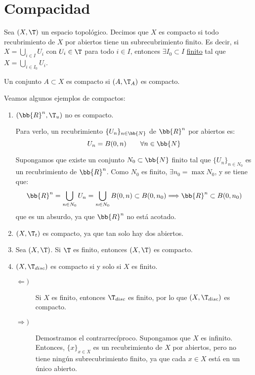 \section{Compacidad}

\begin{definicion}
    Sea $(X,\T)$ un espacio topológico. Decimos que $X$ es compacto si todo recubrimiento de $X$ por abiertos tiene un subrecubrimiento finito.
    Es decir, si $X=\bigcup\limits_{i\in I}U_i$ con $U_i\in \T$ para todo $i\in I$, entonces $\exists I_0\subset I$ \ul{finito} tal que $X=\bigcup\limits_{i\in I_0}U_i$.

    Un conjunto $A\subset X$ es compacto si $(A,\T_{A})$ es compacto.
\end{definicion}

\begin{ejemplo}
    Veamos algunos ejemplos de compactos:
    \begin{enumerate}
        \item $(\bb{R}^n,\T_u)$ no es compacto.
        
        Para verlo, un recubrimiento $\{U_n\}_{n\in \bb{N}}$ de $\bb{R}^n$ por abiertos es:
        \begin{equation*}
            U_n = B(0, n)  \qquad \forall n\in \bb{N}
        \end{equation*}

        Supongamos que existe un conjunto $N_0\subset \bb{N}$ finito tal que $\{U_n\}_{n\in N_0}$ es un recubrimiento de $\bb{R}^n$.
        Como $N_0$ es finito, $\exists n_0=\max N_0$, y se tiene que:
        \begin{equation*}
            \bb{R}^n= \bigcup_{n\in N_0}U_n = \bigcup_{n\in N_0}B(0,n) \subset B(0,n_0) \Longrightarrow \bb{R}^n \subset B(0,n_0)
        \end{equation*}
        que es un absurdo, ya que $\bb{R}^n$ no está acotado.

        \item $(X,\T_t)$ es compacto, ya que tan solo hay dos abiertos.
        
        \item Sea $(X,\T)$. Si $\T$ es finito, entonces $(X,\T)$ es compacto.
        
        \item $(X,\T_{disc})$ es compacto si y solo si $X$ es finito.
        \begin{description}
            \item[$\Longleftarrow)$] Si $X$ es finito, entonces $\T_{disc}$ es finito, por lo que $(X,\T_{disc})$ es compacto.
            \item[$\Longrightarrow)$] Demostramos el contrarrecíproco. Supongamos que $X$ es infinito. Entonces, $\{x\}_{x\in X}$ es un recubrimiento de $X$ por abiertos,
            pero no tiene ningún subrecubrimiento finito, ya que cada $x\in X$ está en un único abierto.
        \end{description}


\end{enumerate}
\end{ejemplo}
